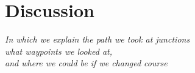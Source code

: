 \chapter{Discussion}\label{ch:disc}

\begin{flushright}{\slshape
    In which we explain the path we took at junctions\\
    what waypoints we looked at,\\
    and where we could be if we changed course
}
\end{flushright}
